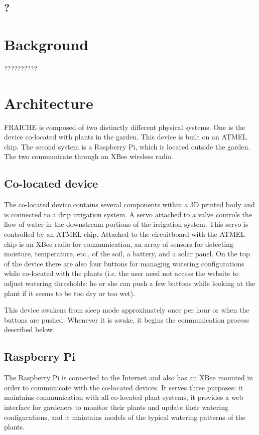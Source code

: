 \documentclass[a4paper]{article}
\begin{document}
\subsection{?}

\section{Background}

??????????

\section{Architecture}

FRAICHE is composed of two distinctly different physical systems.  One is the device co-located with plants in the garden.  This device is built on an ATMEL chip.  The second system is a Raspberry Pi, which is located outside the garden.  The two communicate through an XBee wireless radio.

\subsection{Co-located device}

The co-located device contains several components within a 3D printed body and is connected to a drip irrigation system.  A servo attached to a valve controls the flow of water in the downstream portions of the irrigation system.  This servo is controlled by an ATMEL chip.  Attached to the circuitboard with the ATMEL chip is an XBee radio for communication, an array of sensors for detecting moisture, temperature, etc., of the soil, a battery, and a solar panel.  On the top of the device there are also four buttons for managing watering configurations while co-located with the plants (i.e. the user need not access the website to adjust watering thresholds: he or she can push a few buttons while looking at the plant if it seems to be too dry or too wet).

This device awakens from sleep mode approximately once per hour or when the buttons are pushed.  Whenever it is awake, it begins the communication process described below.

\subsection{Raspberry Pi}

The Raspberry Pi is connected to the Internet and also has an XBee mounted in order to communicate with the co-located devices.  It serves three purposes: it maintains communication with all co-located plant systems, it provides a web interface for gardeners to monitor their plants and update their watering configurations, and it maintains models of the typical watering patterns of the plants.
\end{document}
